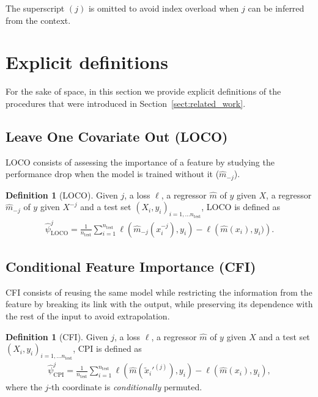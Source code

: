 \documentclass{article}
\theoremstyle{plain}
\theoremstyle{definition}
\newtheorem{definition}[theorem]{Definition}
\theoremstyle{remark}
\begin{document}
The superscript $(j)$ is omitted to avoid index overload when $j$ can be inferred from the context. %


\section{Explicit definitions}\label{sect:LOCO_CFI_MX}

For the sake of space, in this section we provide explicit definitions of the procedures that were introduced in Section~\ref{sect:related_work}.



\subsection{Leave One Covariate Out (LOCO)}

LOCO consists of assessing the importance of a feature by studying the performance drop when the model is trained without it ($\widehat{m}_{-j}$).


\begin{definition}[LOCO] Given $j$, a loss $\ell$, a regressor $\widehat{m}$ of $y$ given $X$, a regressor $\widehat{m}_{-j}$ of $y$ given $X^{-j}$ and a test set $(X_i, y_i)_{i=1,\ldots n_\mathrm{test}}$, LOCO is defined as
\begin{align*}
    \widehat{\psi}_\mathrm{LOCO}^j=\frac{1}{n_{\mathrm{test}}}\sum_{i=1}^{n_{\mathrm{test}}}\ell\left(\widehat{m}_{-j}(x_{i}^{-j}), y_i\right)-\ell\left(\widehat{m}(x_{i}),y_i)\right).
\end{align*}
\end{definition}

\subsection{Conditional Feature Importance (CFI)}\label{app:CFI}

CFI consists of reusing the same model while restricting the information from the feature by breaking its link with the output, while preserving its dependence with the rest of the input to avoid extrapolation.

\begin{definition}[CFI] Given $j$, a loss $\ell$, a regressor $\widehat{m}$ of $y$ given $X$ and a test set $(X_i, y_i)_{i=1,\ldots n_\mathrm{test}}$, CPI is defined as
\begin{align*}
    \widehat{\psi}_{\mathrm{CPI}}^j=\frac{1}{n_{\mathrm{test}}}\sum_{i=1}^{n_{\mathrm{test}}}\ell\left(\widehat{m}(\widetilde{x}_{i}'^{(j)}),y_i\right)-\ell\left(\widehat{m}(x_{i}), y_i\right),
\end{align*}
where the $j$-th coordinate is \textit{conditionally} permuted.
\end{definition}
\end{document}
